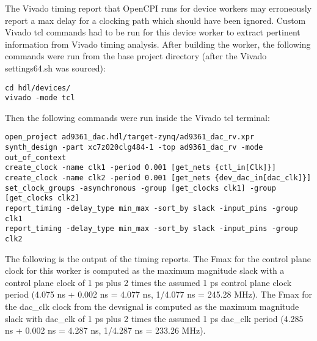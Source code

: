 \documentclass{article}
\begin{document}
The Vivado timing report that OpenCPI runs for device workers may erroneously report a max delay for a clocking path which should have been ignored. Custom Vivado tcl commands had to be run for this device worker to extract pertinent information from Vivado timing analysis. After building the worker, the following commands were run from the base project directory (after the Vivado settings64.sh was sourced):
\begin{lstlisting}
cd hdl/devices/
vivado -mode tcl
\end{lstlisting}
Then the following commands were run inside the Vivado tcl terminal:
\begin{lstlisting}
open_project ad9361_dac.hdl/target-zynq/ad9361_dac_rv.xpr
synth_design -part xc7z020clg484-1 -top ad9361_dac_rv -mode out_of_context
create_clock -name clk1 -period 0.001 [get_nets {ctl_in[Clk]}]
create_clock -name clk2 -period 0.001 [get_nets {dev_dac_in[dac_clk]}]
set_clock_groups -asynchronous -group [get_clocks clk1] -group [get_clocks clk2]
report_timing -delay_type min_max -sort_by slack -input_pins -group clk1
report_timing -delay_type min_max -sort_by slack -input_pins -group clk2
\end{lstlisting}
The following is the output of the timing reports. The Fmax for the control plane clock for this worker is computed as the maximum magnitude slack with a control plane clock of 1 ps plus 2 times the assumed 1 ps control plane clock period (4.075 ns + 0.002 ns = 4.077 ns, 1/4.077 ns = 245.28 MHz). The Fmax for the dac\_clk clock from the devsignal is computed as the maximum magnitude slack with dac\_clk of 1 ps plus 2 times the assumed 1 ps dac\_clk period (4.285 ns + 0.002 ns = 4.287 ns, 1/4.287 ns = 233.26 MHz).
\fontsize{6}{12}\selectfont
\end{document}
